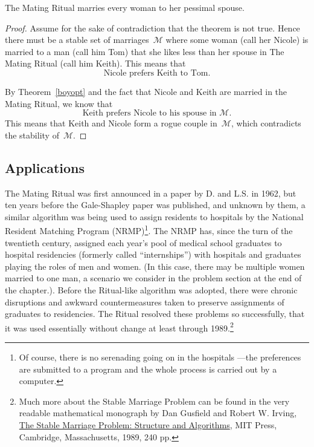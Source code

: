 \begin{theorem}
The Mating Ritual marries every woman to her pessimal spouse.
\end{theorem}

\begin{proof}
Assume for the sake of contradiction that the theorem is not true.
Hence there must be a stable set of marriages~$\mathcal{M}$ where some
woman (call her Nicole) is married to a man (call him Tom) that she
likes less than her spouse in The Mating Ritual (call him Keith).
This means that
\begin{equation}
\text{Nicole prefers Keith to Tom.} \tag{+}
\end{equation}

By Theorem~\ref{boyopt} and the fact that Nicole and Keith are married
in the Mating Ritual, we know that 
\begin{equation}\tag{++}
\text{Keith prefers Nicole to his spouse in~$\mathcal{M}$.}
\end{equation}
This means that Keith and Nicole form a rogue couple in~$\mathcal{M}$,
which contradicts the stability of~$\mathcal{M}$.
\end{proof}

\subsection{Applications}

The Mating Ritual was first announced in a paper by D.  and
L.S.  in 1962, but ten years before the Gale-Shapley
paper was published, and unknown by them, a similar algorithm was
being used to assign residents to hospitals by the National Resident
Matching Program (NRMP)\footnote{Of course, there is no serenading
  going on in the hospitals ---the preferences are submitted to a
  program and the whole process is carried out by a computer.}.  The
NRMP has, since the turn of the twentieth century, assigned each
year's pool of medical school graduates to hospital residencies
(formerly called ``internships'') with hospitals and graduates playing
the roles of men and women.  (In this case, there may be multiple
women married to one man, a scenario we consider in the problem
section at the end of the chapter.).  Before the Ritual-like algorithm
was adopted, there were chronic disruptions and awkward
countermeasures taken to preserve assignments of graduates to
residencies.  The Ritual resolved these problems so successfully, that
it was used essentially without change at least through
1989.\footnote{Much more about the Stable Marriage Problem can be
  found in the very readable mathematical monograph by Dan Gusfield
  and Robert W. Irving,
  \href{http://mitpress.mit.edu/catalog/item/default.asp?ttype=2&tid=7676}{The
    Stable Marriage Problem: Structure and Algorithms}, MIT Press,
  Cambridge, Massachusetts, 1989, 240 pp.}

